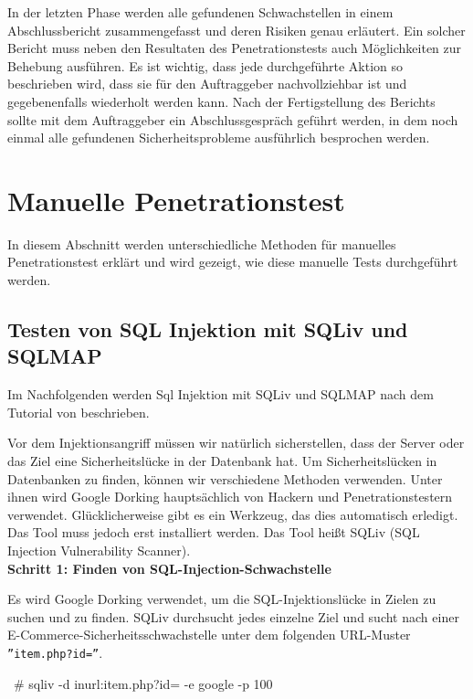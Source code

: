 In der letzten Phase werden alle gefundenen Schwachstellen in einem Abschlussbericht zusammengefasst
und deren Risiken genau erläutert. Ein solcher Bericht muss neben den Resultaten des Penetrationstests auch
Möglichkeiten zur Behebung ausführen. Es ist wichtig, dass jede durchgeführte Aktion so beschrieben wird,
dass sie für den Auftraggeber nachvollziehbar ist und gegebenenfalls wiederholt werden kann. Nach der
Fertigstellung des Berichts sollte mit dem Auftraggeber ein Abschlussgespräch geführt werden, in dem noch
einmal alle gefundenen Sicherheitsprobleme ausführlich besprochen werden.

\section{Manuelle Penetrationstest}

In diesem Abschnitt werden unterschiedliche Methoden für manuelles Penetrationstest erklärt und wird gezeigt, wie diese manuelle Tests durchgeführt werden. 

\subsection{Testen von SQL Injektion mit SQLiv und SQLMAP}

Im Nachfolgenden werden Sql Injektion mit SQLiv und SQLMAP nach dem Tutorial von \cite{ramadhan17sqlinj} beschrieben.

Vor dem Injektionsangriff müssen wir natürlich sicherstellen, dass der Server oder das Ziel eine Sicherheitslücke in der Datenbank hat. Um Sicherheitslücken in Datenbanken zu finden, können wir verschiedene Methoden verwenden. Unter ihnen wird Google Dorking hauptsächlich von Hackern und Penetrationstestern verwendet. Glücklicherweise gibt es ein Werkzeug, das dies automatisch erledigt. Das Tool muss jedoch erst installiert werden. Das Tool heißt SQLiv (SQL Injection Vulnerability Scanner).\\

\textbf{Schritt 1: Finden von SQL-Injection-Schwachstelle}

Es wird Google Dorking verwendet, um die SQL-Injektionslücke in Zielen zu suchen und zu finden. SQLiv durchsucht jedes einzelne Ziel und sucht nach einer E-Commerce-Sicherheitsschwachstelle unter dem folgenden URL-Muster \texttt{''item.php?id=''}.\\

\begin{LaTeXCode}[caption={Google Dorking mit SQLiv},captionpos=b, label=LaTeXCode:gdsqliv][numbers=none]
~# sqliv -d inurl:item.php?id= -e google -p 100
\end{LaTeXCode}

